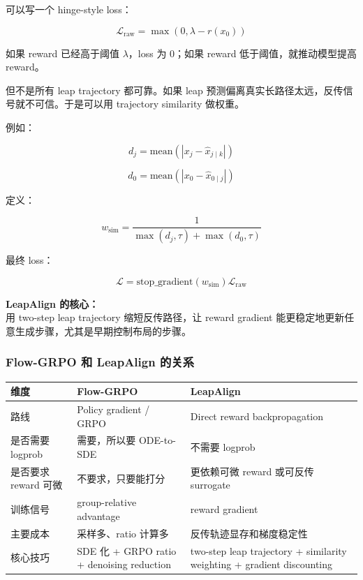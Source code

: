 可以写一个 hinge-style loss：

\[
\mathcal{L}_\text{raw}
=
\max(0,\lambda-r(x_0))
\]

如果 reward 已经高于阈值 $\lambda$，loss 为 0；如果 reward 低于阈值，就推动模型提高 reward。

但不是所有 leap trajectory 都可靠。如果 leap 预测偏离真实长路径太远，反传信号就不可信。于是可以用 trajectory similarity 做权重。

例如：

\[
d_j
=
\text{mean}
\left(
|x_j-\hat{x}_{j\mid k}|
\right)
\]

\[
d_0
=
\text{mean}
\left(
|x_0-\hat{x}_{0\mid j}|
\right)
\]

定义：

\[
w_\text{sim}
=
\frac{1}
{\max(d_j,\tau)+\max(d_0,\tau)}
\]

最终 loss：

\[
\mathcal{L}
=
\text{stop\_gradient}(w_\text{sim})
\mathcal{L}_\text{raw}
\]

\begin{summarybox}
\textbf{LeapAlign 的核心：}\\
用 two-step leap trajectory 缩短反传路径，让 reward gradient 能更稳定地更新任意生成步骤，尤其是早期控制布局的步骤。
\end{summarybox}

\subsubsection{Flow-GRPO 和 LeapAlign 的关系}

\begin{center}
{\small
\begin{tabular}{p{3cm}p{4.8cm}p{4.8cm}}
\hline
\textbf{维度} & \textbf{Flow-GRPO} & \textbf{LeapAlign} \\
\hline
路线
&
Policy gradient / GRPO
&
Direct reward backpropagation
\\
是否需要 logprob
&
需要，所以要 ODE-to-SDE
&
不需要 logprob
\\
是否要求 reward 可微
&
不要求，只要能打分
&
更依赖可微 reward 或可反传 surrogate
\\
训练信号
&
group-relative advantage
&
reward gradient
\\
主要成本
&
采样多、ratio 计算多
&
反传轨迹显存和梯度稳定性
\\
核心技巧
&
SDE 化 + GRPO ratio + denoising reduction
&
two-step leap trajectory + similarity weighting + gradient discounting
\\
\hline
\end{tabular}
}
\end{center}

